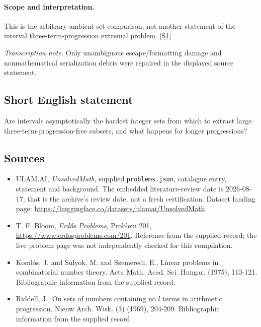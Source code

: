 \documentclass[11pt,a4paper]{article}
\newcommand{\sref}[2]{\hyperlink{source:#1:#2}{[S#2]}}
\begin{document}
\paragraph{Scope and interpretation.}

This is the arbitrary-ambient-set comparison, not another statement of the interval three-term-progression extremal problem. \sref{statement}{1}

{\small\emph{Transcription note.} Only unambiguous escape/formatting damage and nonmathematical serialization debris were repaired in the displayed source statement.}

\subsection{Short English statement}

Are intervals asymptotically the hardest integer sets from which to extract large three-term-progression-free subsets, and what happens for longer progressions?

\subsection{Sources}

{\small

\begin{itemize}

\item[\hypertarget{source:statement:1}{S1}] ULAM.AI, \emph{UnsolvedMath}, supplied \texttt{problems.json}, catalogue entry, statement and background. The embedded literature-review date is 2026-08-17; that is the archive’s review date, not a fresh certification. Dataset landing page: \url{https://huggingface.co/datasets/ulamai/UnsolvedMath}.

\item[\hypertarget{source:statement:2}{S2}] T. F. Bloom, \emph{Erdős Problems}, Problem 201, \url{https://www.erdosproblems.com/201}. Reference from the supplied record; the live problem page was not independently checked for this compilation.

\item[\hypertarget{source:statement:3}{S3}] Koml\'{o}s, J. and Sulyok, M. and Szemeredi, E., Linear problems in combinatorial number theory. Acta Math. Acad. Sci. Hungar. (1975), 113-121. Bibliographic information from the supplied record.

\item[\hypertarget{source:statement:4}{S4}] Riddell, J., On sets of numbers containing no $l$ terms in arithmetic progression. Nieuw Arch. Wisk. (3) (1969), 204-209. Bibliographic information from the supplied record.

\end{itemize}

}

\label{end:statement}
\end{document}
